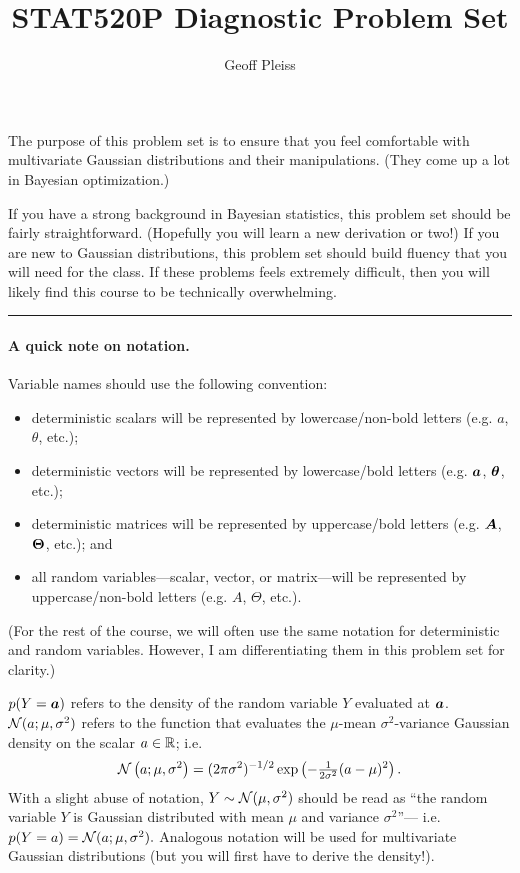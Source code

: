 \documentclass[11pt,letterpaper]{article}
\title{STAT520P Diagnostic Problem Set}
\author{Geoff Pleiss}  %
\newcommand{\sectionbreak}{%
  \vspace{1em}
  \hrule
}
\newcommand{\doccolor}{gray}
\newcommand{\doccolor}{black}
\begin{document}
\maketitle

\color{\doccolor}
The purpose of this problem set is to ensure that you feel comfortable with multivariate Gaussian distributions and their manipulations.
(They come up a lot in Bayesian optimization.)

If you have a strong background in Bayesian statistics, this problem set should be fairly straightforward.
(Hopefully you will learn a new derivation or two!)
If you are new to Gaussian distributions, this problem set should build fluency that you will need for the class.
If these problems feels extremely difficult, then you will likely find this course to be technically overwhelming.

\sectionbreak

\paragraph{A quick note on notation.}
Variable names should use the following convention:
\begin{itemize}
  \item deterministic scalars will be represented by lowercase/non-bold letters (e.g. $a$, $\theta$, etc.);
  \item deterministic vectors will be represented by lowercase/bold letters (e.g. ${\bm{a}}$, ${\bm{\theta}}$, etc.);
  \item deterministic matrices will be represented by uppercase/bold letters (e.g. ${\bm{A}}$, ${\bm{\Theta}}$, etc.); and
  \item all random variables---scalar, vector, or matrix---will be represented by uppercase/non-bold letters (e.g. $A$, $\Theta$, etc.).
\end{itemize}
%
(For the rest of the course, we will often use the same notation for deterministic and random variables.
However, I am differentiating them in this problem set for clarity.)

$p(Y={\bm{a}})$ refers to the density of the random variable $Y$ evaluated at ${\bm{a}}$.
$\mathcal{N}(a; \mu, \sigma^2)$ refers to the function that evaluates the $\mu$-mean $\sigma^2$-variance Gaussian density on the scalar $a \in \mathbb{R}$;
i.e.
\begin{equation}
  \mathcal{N} \left( a; \mu, \sigma^2 \right)
  = (2 \pi \sigma^2)^{-1/2} \exp \left( -\tfrac{1}{2 \sigma^2} (a - \mu)^2 \right).
  \label{eqn:univariate_density}
\end{equation}
With a slight abuse of notation,
$Y \sim \mathcal{N}(\mu, \sigma^2)$ should be read as ``the random variable $Y$ is Gaussian distributed with mean $\mu$ and variance $\sigma^2$''---%
i.e. $p(Y = a) = \mathcal{N}(a; \mu, \sigma^2).$
Analogous notation will be used for multivariate Gaussian distributions (but you will first have to derive the density!).
\end{document}
